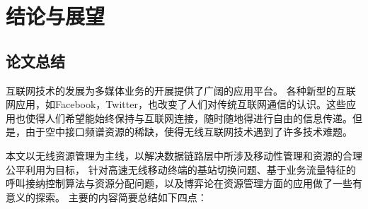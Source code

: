 \chapter{结论与展望}
\label{chap_conclusions}
\section{论文总结}
互联网技术的发展为多媒体业务的开展提供了广阔的应用平台。
各种新型的互联网应用，如Facebook，Twitter，也改变了人们对传统互联网通信的认识。这些应用也使得人们希望能始终保持与互联网连接，随时随地得进行自由的信息传递。但是，由于空中接口频谱资源的稀缺，使得无线互联网技术遇到了许多技术难题。

本文以无线资源管理为主线，以解决数据链路层中所涉及移动性管理和资源的合理公平利用为目标，
针对高速无线移动终端的基站切换问题、基于业务流量特征的呼叫接纳控制算法与资源分配问题，以及博弈论在资源管理方面的应用做了一些有意义的探索。
主要的内容简要总结如下四点：

